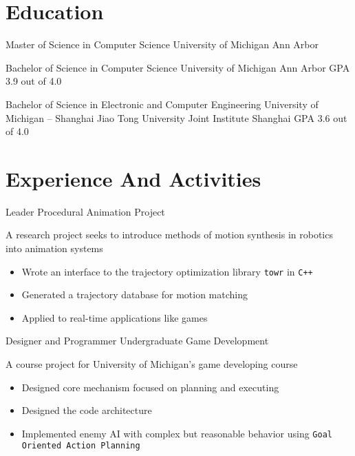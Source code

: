 \documentclass[10pt, a4paper, sans]{moderncv}
\title{}
\begin{document}
\makecvtitle

\section{Education}
{Master of Science in Computer Science}
{University of Michigan}
{Ann Arbor}
{}
{}

{Bachelor of Science in Computer Science}
{University of Michigan}
{Ann Arbor}
{GPA 3.9 out of 4.0}
{}

{Bachelor of Science in Electronic and Computer Engineering}
{University of Michigan -- Shanghai Jiao Tong University Joint Institute}
{Shanghai}
{GPA 3.6 out of 4.0}
{}

\section{Experience And Activities}
{Leader}
{Procedural Animation Project}
{}{}
{A research project seeks to introduce methods of motion synthesis in robotics into animation systems
	\begin{itemize}
		\item Wrote an interface to the trajectory optimization library \texttt{towr} in \texttt{C++}
		\item Generated a trajectory database for motion matching
		\item Applied to real-time applications like games
	\end{itemize}
}

{Designer and Programmer}
{Undergraduate Game Development}
{}{}
{A course project for University of Michigan's game developing course
	\begin{itemize}
		\item Designed core mechanism focused on planning and executing
		\item Designed the code architecture
		\item Implemented enemy AI with complex but reasonable behavior using \texttt{Goal Oriented Action Planning}
	\end{itemize}
}
\end{document}
